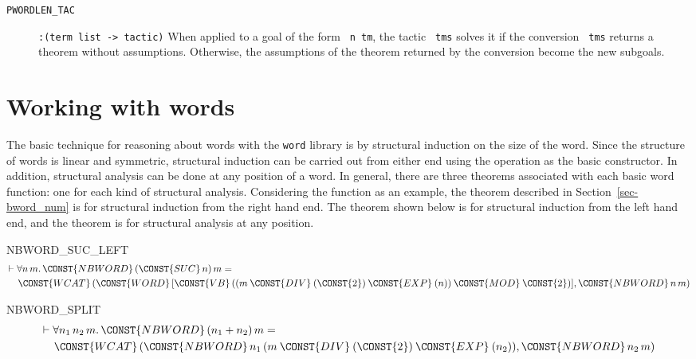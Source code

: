 \begin{description}
\item[{\tt PWORDLEN\_TAC}] \verb|:(term list -> tactic)|
When applied to a goal of the form {\tt{} n tm}, the
tactic {\tt{} tms} solves it if the conversion
{\tt{} tms} returns a theorem without assumptions.
Otherwise, the assumptions of the theorem returned by the conversion
become the new subgoals.
\end{description}

\section{Working with words}

The basic technique for reasoning about words with the {\tt word}
library is by structural induction on the size of the word.
Since the structure of words is linear and symmetric, structural
induction can be carried out from either end using the 
operation as the basic constructor. In addition, structural analysis
can be done at any position of a word. In general, there are three
theorems associated with each basic word function: one for each kind
of structural analysis. Considering the function  as an
example, the theorem  
described in Section~\ref{sec-bword_num} is for structural induction
from the right hand end. The theorem  shown
below is for structural induction from the left hand end, and the
theorem  is for structural analysis at any
position.
\begin{holthm}{NBWORD_SUC_LEFT}
\begin{eqnarray*}
\lefteqn{\THM \FORALL n \,m\DOT
        \CONST{NBWORD} \,(\CONST{SUC} \,n) \,m =}\\
 & & \CONST{WCAT}
              \,(\CONST{WORD}
                    \,[\CONST{VB}
                          \,((m \:\CONST{DIV}\:
                                 ( \CONST{2}
                                   )\:\CONST{EXP}\:( n )) \:\CONST{MOD}\:
                                \CONST{2})],
                 \CONST{NBWORD} \,n \,m)
\end{eqnarray*}
\end{holthm}
\begin{holthm}{NBWORD_SPLIT}
\begin{eqnarray*}
\lefteqn{\THM \FORALL n_{1} \,n_{2} \,m\DOT
        \CONST{NBWORD} \,(n_{1} + n_{2}) \,m =} \\
 & & \CONST{WCAT}
              \,(\CONST{NBWORD} \,n_{1}
                    \,(m \:\CONST{DIV}\:
                          ( \CONST{2} )\:\CONST{EXP}\:( n_{2} )),
                 \CONST{NBWORD} \,n_{2} \,m)
\end{eqnarray*}
\end{holthm}

